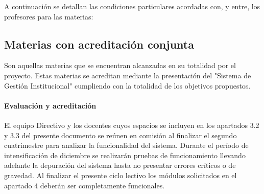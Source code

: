 A continuación se detallan las condiciones particulares acordadas con, y entre, los profesores para las materias:




\subsection{Materias con acreditación conjunta}

Son aquellas materias que se encuentran alcanzadas en su totalidad por el proyecto. Estas materias se acreditan mediante la presentación del "Sistema de Gestión Institucional" cumpliendo con la totalidad de los objetivos propuestos.

\paragraph{Evaluación y acreditación} El equipo Directivo y los docentes cuyos espacios se incluyen en los apartados 3.2 y 3.3 del presente documento se reúnen en comisión al finalizar el segundo cuatrimestre para analizar la funcionalidad del sistema. Durante el período de intensificación de diciembre se realizarán pruebas de funcionamiento llevando adelante la depuración del sistema hasta no presentar errores críticos o de gravedad. Al finalizar el presente ciclo lectivo los módulos solicitados en el apartado 4 deberán ser completamente funcionales.



